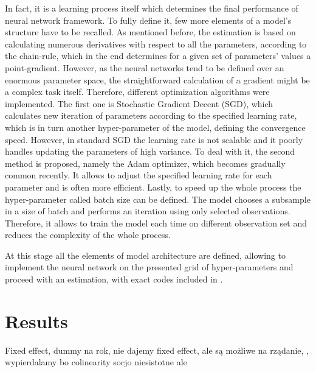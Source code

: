 \documentclass{Trade_template}
\numberwithin{equation}{section}
\begin{document}
In fact, it is a learning process itself which determines the final performance of neural network framework. To fully define it, few more elements of a model’s structure have to be recalled. As mentioned before, the estimation is based on calculating numerous derivatives with respect to all the parameters, according to the chain-rule, which in the end determines for a given set of parameters’ values a point-gradient. However, as the neural networks tend to be defined over an enormous parameter space, the straightforward calculation of a gradient might be a complex task itself. Therefore, different optimization algorithms were implemented. The first one is Stochastic Gradient Decent (SGD), which calculates new iteration of parameters according to the specified learning rate, which is in turn another hyper-parameter of the model, defining the convergence speed. However, in standard SGD the learning rate is not scalable and it poorly handles updating the parameters of high variance. To deal with it, the second method is proposed, namely the Adam optimizer, which becomes gradually common recently. It allows to adjust the specified learning rate for each parameter and is often more efficient. Lastly, to speed up the whole process the hyper-parameter called batch size can be defined. The model chooses a subsample in a size of batch and performs an iteration using only selected observations. Therefore, it allows to train the model each time on different observation set and reduces the complexity of the whole process.

At this stage all the elements of model architecture are defined, allowing to implement the neural network on the presented grid of hyper-parameters and proceed with an estimation, with exact codes included in .

\chapter{Results}

Fixed effect, dummy na rok, nie dajemy fixed effect, ale są możliwe na rządanie, , wypierdalamy bo colinearity socjo niesistotne ale 
\end{document}
